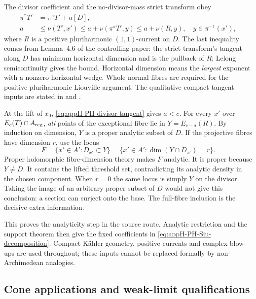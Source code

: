 The divisor coefficient and the no-divisor-mass strict transform obey
\begin{equation*}
\begin{aligned}
 \pi^*T'&=\pi^\diamond T'+a[D],\\
 a&\leq\nu(T',x')\leq a+\nu(\pi^\diamond T',y)
                  \leq a+\nu(R,y),\quad y\in\pi^{-1}(x'),
\end{aligned}
\tag{H.59}\label{eq:appH-PH-divisor-tangent}
\end{equation*}
where $R$ is a positive pluriharmonic $(1,1)$-current on $D$.
The last inequality comes from Lemma~4.6 of the controlling paper:
the strict transform's tangent along $D$ has minimum horizontal
dimension and is the pullback of $R$; Lelong semicontinuity gives
the bound. Horizontal dimension means the \emph{largest} exponent
with a nonzero horizontal wedge. Whole normal fibres are required
for the positive pluriharmonic Liouville argument.
The qualitative compact tangent inputs are stated in
\cite[Theorem~1.18 and Corollary~1.21]{Nguyen22TangentsV2} and
\cite[Theorem~2.14(2)]{Nguyen25IntersectionV1}.

At the lift of $x_0$, \eqref{eq:appH-PH-divisor-tangent} gives $a<c$.
For every $x'$ over $E_c(T)\cap A_{\rm reg}$, \emph{all} points of
the exceptional fibre lie in $Y=E_{c-a}(R)$. By induction on dimension,
$Y$ is a proper analytic subset of $D$. If the projective fibres have
dimension $r$, use the locus
\begin{equation*}
 F=\{x'\in A':D_{x'}\subset Y\}
   =\{x'\in A':\dim(Y\cap D_{x'})=r\}.
\tag{H.60}\label{eq:appH-PH-full-fibre-locus}
\end{equation*}
Proper holomorphic fibre-dimension theory makes $F$ analytic.
It is proper because $Y\ne D$. It contains the lifted threshold
set, contradicting its analytic density in the chosen component.
When $r=0$ the same locus is simply $Y$ on the divisor.
Taking the image of an arbitrary proper subset of $D$ would not
give this conclusion: a section can surject onto the base.
The full-fibre inclusion is the decisive extra information.

This proves the analyticity step in the source route. Analytic
restriction and the support theorem then give the fixed coefficients
in \eqref{eq:appH-PH-Siu-decomposition}. Compact K\"ahler geometry,
positive currents and complex blow-ups are used throughout; these
inputs cannot be replaced formally by non-Archimedean analogies.

\subsection{Cone applications and weak-limit qualifications}
\label{sec:appH-PH-cone-boundary}

